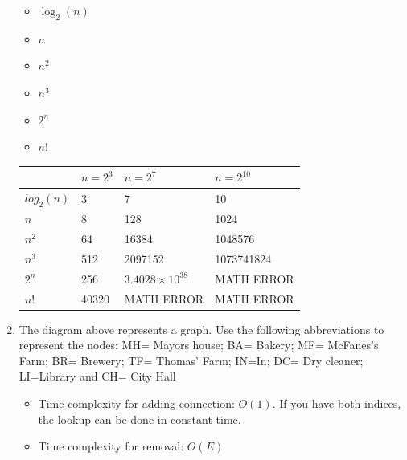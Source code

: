 \documentclass{article}
\begin{document}
\begin{enumerate}
\begin{itemize}
\item $\log_{2}(n)$
\item $n$
\item $n^{2}$
\item $n^{3}$
\item $2^{n}$
\item $n!$
\end{itemize}

\begin{table}[!h]
\centering
\begin{tabular}{|l|l|l|l|}
\hline
 & $n = 2^{3}$ & $n = 2^{7}$ & $n = 2^{10}$ \\ \hline
$log_{2}(n)$ & 3 & 7 & 10 \\ \hline
$n$ & 8 & 128 & 1024 \\ \hline
$n^{2}$ & 64 & 16384 & 1048576 \\ \hline
$n^{3}$ & 512 & 2097152 & 1073741824 \\ \hline
$2^{n}$ & 256 & $3.4028 \times 10^{38}$ & MATH ERROR \\ \hline
$n!$ & 40320 & MATH ERROR & MATH ERROR \\ \hline
\end{tabular}
\end{table}

\newpage

\item The diagram above represents a graph. Use the following abbreviations to represent the nodes: MH= Mayors house; BA= Bakery; MF= McFanes’s Farm; BR= Brewery; TF= Thomas’ Farm; IN=In; DC= Dry cleaner; LI=Library and CH= City Hall

\begin{itemize}
\item Time complexity for adding connection: $O(1)$. If you have both indices, the lookup can be done in constant time.
\item Time complexity for removal: $O(E)$
\end{itemize}


\end{enumerate}
\end{document}
